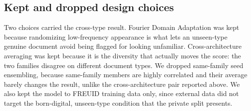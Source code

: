 \documentclass[11pt,a4paper]{article}
\begin{document}
\subsection{Kept and dropped design choices}
\label{sec:ablation}
Two choices carried the cross-type result. Fourier Domain Adaptation was kept because randomizing
low-frequency appearance is what lets an unseen-type genuine document avoid being flagged for looking
unfamiliar. Cross-architecture averaging was kept because it is the diversity that actually moves the score:
the two families disagree on different document types. We dropped same-family seed ensembling, because
same-family members are highly correlated and their average barely changes the result, unlike the
cross-architecture pair reported above. We also kept the model to FREUID training data only, since external
data did not target the born-digital, unseen-type condition that the private split presents.
\end{document}
